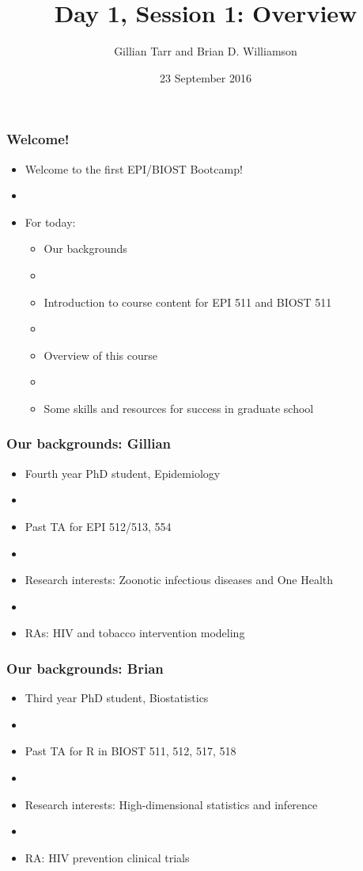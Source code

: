 \documentclass[12pt]{beamer}
\title{Day 1, Session 1: Overview}
\author{Gillian Tarr and Brian D. Williamson}
\institute{EPI/BIOST Bootcamp 2016}
\date{23 September 2016}
\newcommand{\myframe}[1]{\begin{frame} \frametitle{#1}}
\begin{document}
\begin{frame}
\titlepage
\end{frame}

\myframe{Welcome!}
\begin{itemize}
\item Welcome to the first EPI/BIOST Bootcamp!
\item[]
\item For today:
\begin{itemize}
\item Our backgrounds
\item[]
\item Introduction to course content for EPI 511 and BIOST 511
\item[]
\item Overview of this course
\item[]
\item Some skills and resources for success in graduate school
\end{itemize}
\end{itemize}
\end{frame}

\myframe{Our backgrounds: Gillian}
\begin{itemize}
\item Fourth year PhD student, Epidemiology
\item[]
\item Past TA for EPI 512/513, 554
\item[]
\item Research interests: Zoonotic infectious diseases and One Health
\item[]
\item RAs: HIV and tobacco intervention modeling
\end{itemize}
\end{frame}

\myframe{Our backgrounds: Brian}
\centering
\begin{itemize}
\item Third year PhD student, Biostatistics
\item[]
\item Past TA for R in BIOST 511, 512, 517, 518
\item[]
\item Research interests: High-dimensional statistics and inference
\item[]
\item RA: HIV prevention clinical trials
\end{itemize}
\end{frame}
\end{document}
